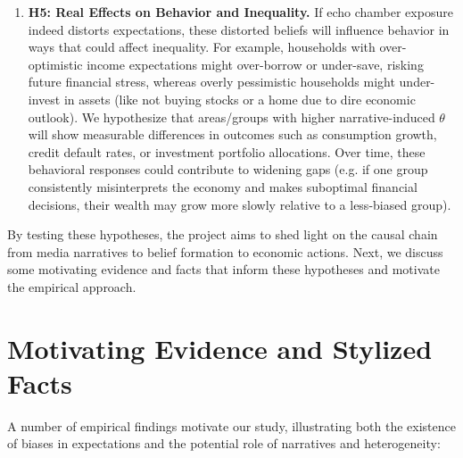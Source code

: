 \documentclass[12pt]{article}
\begin{document}
\begin{enumerate}
    \item \textbf{H5: Real Effects on Behavior and Inequality.} If echo chamber exposure indeed distorts expectations, these distorted beliefs will influence behavior in ways that could affect inequality. For example, households with over-optimistic income expectations might over-borrow or under-save, risking future financial stress, whereas overly pessimistic households might under-invest in assets (like not buying stocks or a home due to dire economic outlook). We hypothesize that areas/groups with higher narrative-induced $\theta$ will show measurable differences in outcomes such as consumption growth, credit default rates, or investment portfolio allocations. Over time, these behavioral responses could contribute to widening gaps (e.g. if one group consistently misinterprets the economy and makes suboptimal financial decisions, their wealth may grow more slowly relative to a less-biased group).
\end{enumerate}
By testing these hypotheses, the project aims to shed light on the causal chain from media narratives to belief formation to economic actions. Next, we discuss some motivating evidence and facts that inform these hypotheses and motivate the empirical approach.


\section{Motivating Evidence and Stylized Facts}
A number of empirical findings motivate our study, illustrating both the existence of biases in expectations and the potential role of narratives and heterogeneity:
\end{document}
